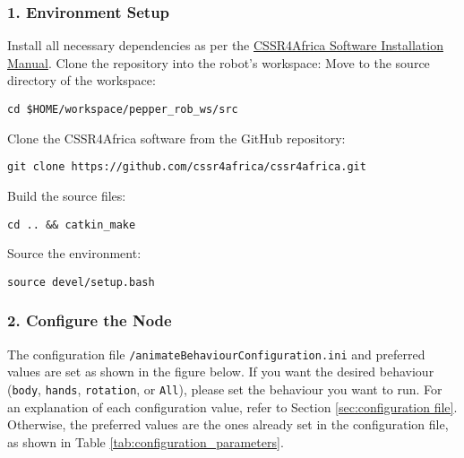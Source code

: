\documentclass{CSSRforAfrica}
\begin{document}
\subsubsection*{1. Environment Setup}
Install all necessary dependencies as per the \href{https://github.com/cssr4africa/cssr4africa/blob/main/docs/D3.3_Software_Installation_Manual.pdf}{CSSR4Africa Software Installation Manual}. Clone the repository into the robot's workspace:
Move to the source directory of the workspace:\\
\begin{lstlisting}[style=linuxbashstyle]
cd $HOME/workspace/pepper_rob_ws/src
\end{lstlisting}
Clone the CSSR4Africa software from the GitHub repository:\\
\begin{lstlisting}[style=linuxbashstyle]
git clone https://github.com/cssr4africa/cssr4africa.git
\end{lstlisting}
 Build the source files:\\
\begin{lstlisting}[style=linuxbashstyle]
cd .. && catkin_make
\end{lstlisting}
Source the environment:\\
\begin{lstlisting}[style=linuxbashstyle]
source devel/setup.bash
\end{lstlisting}
\subsubsection*{2. Configure the Node}
The configuration file \texttt{/animateBehaviourConfiguration.ini} and preferred values are set as shown in the figure below. If you want the desired behaviour (\texttt{body}, \texttt{hands}, \texttt{rotation}, or \texttt{All}), please set the behaviour you want to run. For an explanation of each configuration value, refer to Section \ref{sec:configuration file}. Otherwise, the preferred values are the ones already set in the configuration file, as shown in Table \ref{tab:configuration_parameters}.
\end{document}
